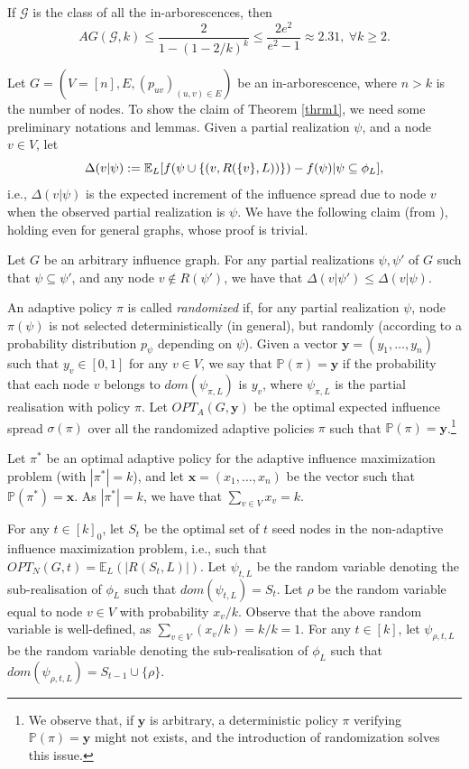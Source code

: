 \begin{theorem}\label{thrm1}
If $\mathcal{G}$ is the class of all the in-arborescences, then $$AG(\mathcal{G},k)\leq \frac{2}{1-(1-2/k)^k}\leq \frac{2e^2}{e^{2}-1}\approx 2.31,\ \forall k\geq 2.$$
\end{theorem}

Let $G=(V=[n],E,(p_{uv})_{(u,v)\in E})$ be an in-arborescence, where $n>k$ is the number of nodes. To show the claim of Theorem \ref{thrm1}, we need some preliminary notations and lemmas. Given a partial realization $\psi$, and a node $v\in V$, let 
$$\Delta(v|\psi):=\mathbb{E}_L[f(\psi\cup \{(v,R(\{v\},L))\})-f(\psi)|\psi\subseteq \phi_L],$$
i.e., $\Delta(v|\psi)$ is the expected increment of the influence spread due to node $v$ when the observed partial realization is $\psi$. We have the following claim (from \cite{Golovin2011a}), holding even for general graphs, whose proof is trivial. 

\begin{claim}\label{lem0}
Let $G$ be an arbitrary influence graph. For any partial realizations $\psi,\psi'$ of $G$ such that $\psi\subseteq \psi'$, and any node $v\notin R(\psi')$, we have that  $\Delta(v|\psi')\leq \Delta(v|\psi)$. 
\end{claim}


An adaptive policy $\pi$ is called {\em randomized} if, for any partial realization $\psi$, node $\pi(\psi)$ is not selected deterministically (in general), but randomly (according to a probability distribution $p_{\psi}$ depending on $\psi$). Given a vector $\bm y=(y_1,\ldots, y_n)$ such that $y_v\in [0,1]$ for any $v\in V$, we say that $\mathbb{P}(\pi)=\bm y$ if the probability that each node $v$ belongs to $dom(\psi_{\pi,L})$ is $y_v$, where $\psi_{\pi,L}$ is the partial realisation with policy $\pi$. Let $OPT_A(G,\bm y)$ be the optimal expected influence spread $\sigma(\pi)$ over all the randomized adaptive policies $\pi$ such that $\mathbb{P}(\pi)=\bm y$.\footnote{We observe that, if $\bm y$ is arbitrary, a deterministic policy $\pi$ verifying $\mathbb{P}(\pi)=\bm y$ might not exists, and the introduction of randomization solves this issue.}

Let $\pi^*$ be an optimal adaptive policy for the adaptive influence maximization problem (with $|\pi^*|=k$), and let $\bm x=(x_1,\ldots, x_n)$ be the vector such that $\mathbb{P}(\pi^*)=\bm x$. As $|\pi^*|=k$, we have that $\sum_{v\in V} x_v=k$. 

For any $t\in [k]_0$, let $S_t$ be the optimal set of $t$ seed nodes in the non-adaptive influence maximization problem, i.e., such that $OPT_N(G,t)=\mathbb{E}_L(|R(S_t,L)|)$. Let $\psi_{t,L}$ be the random variable denoting the sub-realisation of $\phi_L$ such that $dom(\psi_{t,L})=S_t$. Let $\rho$ be the random variable equal to node $v\in V$ with probability $x_v/k$. Observe that the above random variable is well-defined, as $\sum_{v\in V}(x_v/k)=k/k=1$. For any $t\in [k]$, let ${\psi}_{\rho,t,L}$ be the random variable denoting the sub-realisation of $\phi_L$ such that $dom({\psi}_{\rho,t,L})=S_{t-1}\cup\{\rho\}$.

